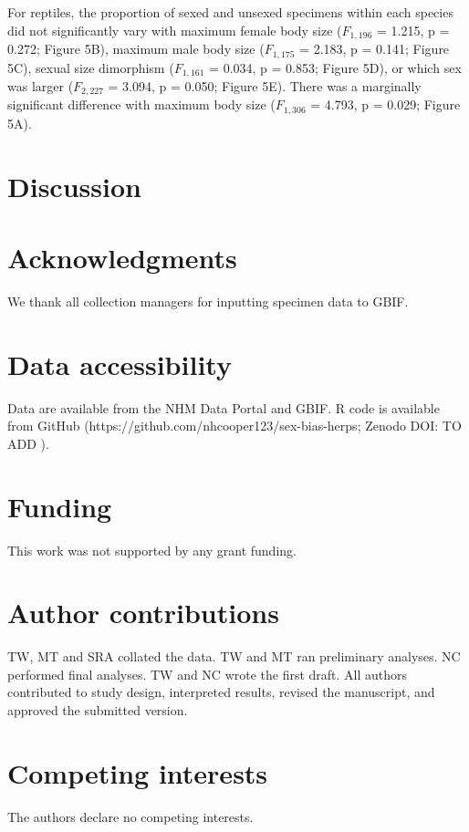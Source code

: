 \documentclass[a4paper, 12pt]{article}
\begin{document}
For reptiles, the proportion of sexed and unsexed specimens within each species did not significantly vary with maximum female body size  ($F_{1,196}$ =  1.215, p = 0.272; Figure 5B), maximum male body size ($F_{1,175}$ =  2.183, p = 0.141; Figure 5C), sexual size dimorphism ($F_{1,161}$ =  0.034, p = 0.853; Figure 5D), or which sex was larger ($F_{2,227}$ =  3.094, p = 0.050; Figure 5E). There was a marginally significant difference with maximum body size ($F_{1,306}$ =  4.793, p = 0.029; Figure 5A).


\section{Discussion}

\section{Acknowledgments}
We thank all collection managers for inputting specimen data to GBIF.

\section{Data accessibility}\label{data-code-and-materials}
Data are available from the NHM Data Portal \cite{sex-bias-data-herps} and GBIF\cite{gbif-amphibians,gbif-reptiles}. 
R code is available from GitHub (https://github.com/nhcooper123/sex-bias-herps; Zenodo DOI: TO ADD \cite{coopercode2022}).

\section{Funding}
This work was not supported by any grant funding.

\section{Author contributions}
TW, MT and SRA collated the data. TW and MT ran preliminary analyses. NC performed final analyses. TW and NC wrote the first draft. All authors contributed to study design, interpreted results, revised the manuscript, and approved the submitted version.

\section{Competing interests}
The authors declare no competing interests.
\end{document}
